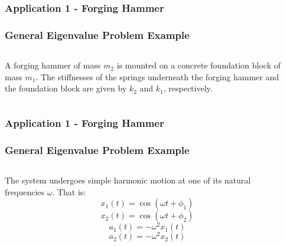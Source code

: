 \documentclass[fleqn]{beamer} %
\newcommand{\sectionIIsubsectionIIItitle}{Application 1 - Forging Hammer}
\begin{document}
			\begin{frame}
				\frametitle{\sectionIIsubsectionIIItitle}\small
				\bigskip

				\frametitle{General Eigenvalue Problem Example}
				\begin{columns}
					\begin{column}{0.5\textwidth}
						A forging hammer of mass $m_2$ is mounted on a concrete
						foundation block of mass $m_1$. The stiffnesses of the springs
						underneath the forging hammer and the foundation block are given
						by $k_2$ and $k_1$, respectively.
					\end{column}
					\begin{column}{0.5\textwidth}
					\end{column}
				\end{columns}

				\btVFill 
			\end{frame}

			\begin{frame}
				\frametitle{\sectionIIsubsectionIIItitle}\small
				\bigskip

				 \frametitle{General Eigenvalue Problem Example}

				  \begin{columns}
				    \begin{column}{0.5\textwidth}
				      The system undergoes simple harmonic motion at one of its
				      natural frequencies $\omega$. That is:
				      \begin{displaymath}
				        x_1(t) = \cos ( \omega t + \phi_1 )
				      \end{displaymath}
				      \begin{displaymath}
				        x_2(t) = \cos ( \omega t + \phi_2 )
				      \end{displaymath}
				      \begin{displaymath}
				        a_1(t) = - \omega^2 x_1(t)
				      \end{displaymath}
				      \begin{displaymath}
				        a_2(t) = - \omega^2 x_2(t)
				      \end{displaymath}
				    \end{column}
				    \begin{column}{0.5\textwidth}
				      \pgfimage[width=0.9\textwidth]{images/fig41a}
				    \end{column}
				  \end{columns}

				\btVFill 
			\end{frame}
\end{document}
